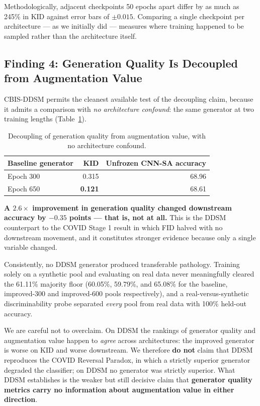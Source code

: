 Methodologically, adjacent checkpoints 50 epochs apart differ by as much as 245\% in KID against error
bars of $\pm 0.015$. Comparing a single checkpoint per architecture --- as we initially did --- measures
where training happened to be sampled rather than the architecture itself.

\subsection{Finding 4: Generation Quality Is Decoupled from Augmentation Value}

CBIS-DDSM permits the cleanest available test of the decoupling claim, because it admits a comparison
with \emph{no architecture confound}: the same generator at two training lengths
(Table~\ref{tab:ddsm_decoupling}).

\begin{table}[h]
\centering
\caption{Decoupling of generation quality from augmentation value, with no architecture confound.}
\label{tab:ddsm_decoupling}
\begin{tabular}{lrr}
\toprule
\textbf{Baseline generator} & \textbf{KID} & \textbf{Unfrozen CNN-SA accuracy} \\
\midrule
Epoch 300 & 0.315 & 68.96 \\
Epoch 650 & \textbf{0.121} & 68.61 \\
\bottomrule
\end{tabular}
\end{table}

\textbf{A $2.6\times$ improvement in generation quality changed downstream accuracy by $-0.35$ points
--- that is, not at all.} This is the DDSM counterpart to the COVID Stage 1 result in which FID halved
with no downstream movement, and it constitutes stronger evidence because only a single variable
changed.

Consistently, no DDSM generator produced transferable pathology. Training solely on a synthetic pool
and evaluating on real data never meaningfully cleared the 61.11\% majority floor (60.05\%, 59.79\%,
and 65.08\% for the baseline, improved-300 and improved-600 pools respectively), and a
real-versus-synthetic discriminability probe separated \emph{every} pool from real data with 100\%
held-out accuracy.

We are careful not to overclaim. On DDSM the rankings of generator quality and augmentation value
happen to \emph{agree} across architectures: the improved generator is worse on KID and worse
downstream. We therefore \textbf{do not} claim that DDSM reproduces the COVID Reversal Paradox, in
which a strictly superior generator degraded the classifier; on DDSM no generator was strictly
superior. What DDSM establishes is the weaker but still decisive claim that \textbf{generator quality
metrics carry no information about augmentation value in either direction}.

